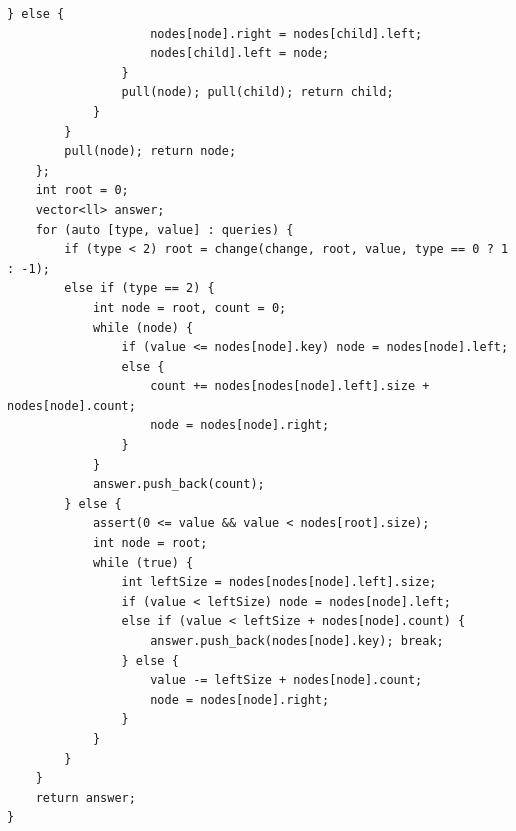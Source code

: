 \begin{lstlisting}[name=order_statistics]
                } else {
                    nodes[node].right = nodes[child].left;
                    nodes[child].left = node;
                }
                pull(node); pull(child); return child;
            }
        }
        pull(node); return node;
    };
    int root = 0;
    vector<ll> answer;
    for (auto [type, value] : queries) {
        if (type < 2) root = change(change, root, value, type == 0 ? 1 : -1);
        else if (type == 2) {
            int node = root, count = 0;
            while (node) {
                if (value <= nodes[node].key) node = nodes[node].left;
                else {
                    count += nodes[nodes[node].left].size + nodes[node].count;
                    node = nodes[node].right;
                }
            }
            answer.push_back(count);
        } else {
            assert(0 <= value && value < nodes[root].size);
            int node = root;
            while (true) {
                int leftSize = nodes[nodes[node].left].size;
                if (value < leftSize) node = nodes[node].left;
                else if (value < leftSize + nodes[node].count) {
                    answer.push_back(nodes[node].key); break;
                } else {
                    value -= leftSize + nodes[node].count;
                    node = nodes[node].right;
                }
            }
        }
    }
    return answer;
}
\end{lstlisting}
%

\fi
